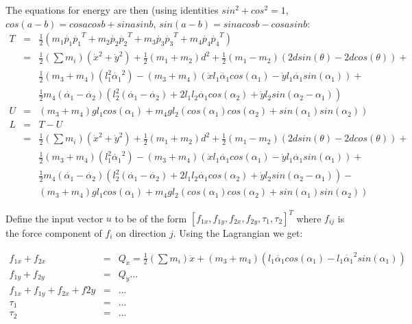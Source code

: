 \documentclass[11pt]{article}
\begin{document}
The equations for energy are then (using identities $sin^2+cos^2=1$, $cos(a-b)=cosacosb+sinasinb$, $sin(a-b)=sinacosb-cosasinb$:
\begin{eqnarray*}
	T &=& \frac{1}{2}(m_1\dot{p_1}\dot{p_1}^T + m_2\dot{p_2}\dot{p_2}^T + m_3\dot{p_3}\dot{p_3}^T + m_4\dot{p_4}\dot{p_4}^T)\\
	  &=& \frac{1}{2}(\sum m_i)(\dot{x}^2+\dot{y}^2) + \frac{1}{2}(m_1+m_2)d^2 + \frac{1}{2}(m_1-m_2)(2dsin(\theta)-2dcos(\theta)) +\\
	  && \frac{1}{2}(m_3+m_4)(l_1^2\dot{\alpha_1}^2)-(m_3+m_4)(\dot{x}l_1\dot{\alpha_1}cos(\alpha_1)-\dot{y}l_1\dot{\alpha_1}sin(\alpha_1)) +\\
	  && \frac{1}{2}m_4(\dot{\alpha_1}-\dot{\alpha_2})(l_2^2(\dot{\alpha_1}-\dot{\alpha_2}) + 2l_1l_2\dot{\alpha_1}cos(\alpha_2) + \dot{y}l_2sin(\alpha_2-\alpha_1))\\
	U &=& (m_3+m_4)gl_1cos(\alpha_1) + m_4gl_2(cos(\alpha_1)cos(\alpha_2) + sin(\alpha_1)sin(\alpha_2))\\
	L &=& T-U\\
	  &=& \frac{1}{2}(\sum m_i)(\dot{x}^2+\dot{y}^2) + \frac{1}{2}(m_1+m_2)d^2 + \frac{1}{2}(m_1-m_2)(2dsin(\theta)-2dcos(\theta)) +\\
	  && \frac{1}{2}(m_3+m_4)(l_1^2\dot{\alpha_1}^2)-(m_3+m_4)(\dot{x}l_1\dot{\alpha_1}cos(\alpha_1)-\dot{y}l_1\dot{\alpha_1}sin(\alpha_1)) +\\
	  && \frac{1}{2}m_4(\dot{\alpha_1}-\dot{\alpha_2})(l_2^2(\dot{\alpha_1}-\dot{\alpha_2}) + 2l_1l_2\dot{\alpha_1}cos(\alpha_2) + \dot{y}l_2sin(\alpha_2-\alpha_1))- \\
	  && (m_3+m_4)gl_1cos(\alpha_1) + m_4gl_2(cos(\alpha_1)cos(\alpha_2) + sin(\alpha_1)sin(\alpha_2))
\end{eqnarray*}

Define the input vector $u$ to be of the form $[f_{1x},f_{1y},f_{2x},f_{2y},\tau_1,\tau_2]^T$ where $f_{ij}$ is the force component of $f_i$ on direction $j$. Using the Lagrangian we get:

\begin{eqnarray*}
	f_{1x}+f_{2x} &=& Q_{\dot{x}} = \frac{1}{2}(\sum m_i)\ddot{x} + (m_3+m_4)(l_1\ddot{\alpha_1}cos(\alpha_1) - l_1\dot{\alpha_1}^2sin(\alpha_1))\\
	f_{1y}+f_{2y} &=& Q_{\dot{y}} ...\\
	f_{1x}+f_{1y}+f_{2x}+f{2y} &=& ...\\
	\tau_1 &=& ...\\
	\tau_2 &=& ...\\
\end{eqnarray*}
\end{document}
